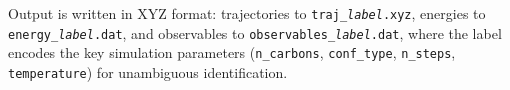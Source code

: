 Output is written in XYZ format: trajectories to
\texttt{traj\_\textit{label}.xyz}, energies to
\texttt{energy\_\textit{label}.dat}, and observables to
\texttt{observables\_\textit{label}.dat}, where the label encodes the key
simulation parameters (\texttt{n\_carbons}, \texttt{conf\_type},
\texttt{n\_steps}, \texttt{temperature}) for unambiguous identification.

